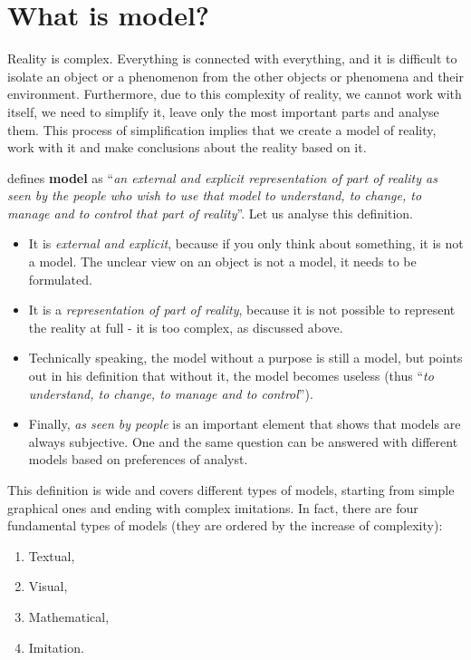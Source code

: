 \documentclass[
]{book}
\providecommand{\tightlist}{%
  \setlength{\itemsep}{0pt}\setlength{\parskip}{0pt}}
\theoremstyle{definition}
\theoremstyle{definition}
\theoremstyle{definition}
\theoremstyle{definition}
\theoremstyle{remark}
\begin{document}
\hypertarget{what-is-model}{%
\section{What is model?}\label{what-is-model}}

Reality is complex. Everything is connected with everything, and it is difficult to isolate an object or a phenomenon from the other objects or phenomena and their environment. Furthermore, due to this complexity of reality, we cannot work with itself, we need to simplify it, leave only the most important parts and analyse them. This process of simplification implies that we create a model of reality, work with it and make conclusions about the reality based on it.

\citet{Pidd2010} defines \textbf{model} as ``\emph{an external and explicit representation of part of reality as seen by the people who wish to use that model to understand, to change, to manage and to control that part of reality}''. Let us analyse this definition.

\begin{itemize}
\tightlist
\item
  It is \emph{external and explicit}, because if you only think about something, it is not a model. The unclear view on an object is not a model, it needs to be formulated.
\item
  It is a \emph{representation of part of reality}, because it is not possible to represent the reality at full - it is too complex, as discussed above.
\item
  Technically speaking, the model without a purpose is still a model, but \citet{Pidd2010} points out in his definition that without it, the model becomes useless (thus ``\emph{to understand, to change, to manage and to control}'').
\item
  Finally, \emph{as seen by people} is an important element that shows that models are always subjective. One and the same question can be answered with different models based on preferences of analyst.
\end{itemize}

This definition is wide and covers different types of models, starting from simple graphical ones and ending with complex imitations. In fact, there are four fundamental types of models (they are ordered by the increase of complexity):

\begin{enumerate}
\def\labelenumi{\arabic{enumi}.}
\tightlist
\item
  Textual,
\item
  Visual,
\item
  Mathematical,
\item
  Imitation.
\end{enumerate}
\end{document}
